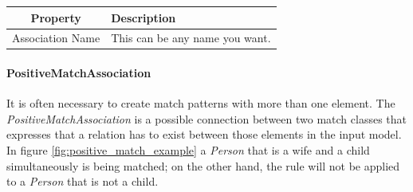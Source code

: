 \begin{figure}[h]
\begin{center}
  \caption{}
  \label{fig:positive_indirect_assoc_examples}
\end{center}
\end{figure}


\begin{center}
  \begin{tabular}{ | c | p{\paragraphsize} | }
    \hline
    \textbf{Property} & \textbf{Description} \\ \hline
    Association Name & This can be any name you want. \\
    \hline
  \end{tabular}
\end{center}


\paragraph{PositiveMatchAssociation}

It is often necessary to create match patterns with more than one element. The
\emph{PositiveMatchAssociation} is a possible connection between two match
classes that expresses that a relation has to exist between those elements in
the input model. In figure \ref{fig:positive_match_example} a \emph{Person} that
is a wife and a child simultaneously is being matched; on the other hand, the
rule will not be applied to a \emph{Person} that is not a child.

